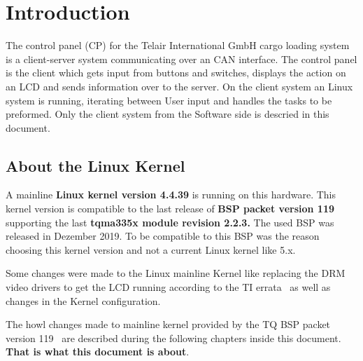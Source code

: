 \chapter{Introduction}\label{chp:einleitung}
The control panel (CP) for the Telair International GmbH cargo loading system is
a client-server system communicating over an CAN interface. The control panel is
the client which gets input from buttons and switches, displays the action on an
LCD and sends information over to the server. On the client system an Linux
system is running, iterating between User input and handles the tasks  to be
preformed.  Only the client system from the Software side is descried in this
document.

\section{About the Linux Kernel}%

A mainline \textbf{Linux kernel version 4.4.39} is running on this hardware.
This kernel version is compatible to the last release of \textbf{\gls{BSP}
packet version 119} supporting the last \textbf{tqma335x module revision 2.2.3.}
The used \gls{BSP} was released in Dezember 2019. To be compatible to this
BSP was the reason choosing this kernel version and not a current Linux kernel
like 5.x.

Some changes were made to the Linux mainline Kernel like replacing the \gls{DRM}
video drivers to get the LCD running according to the TI
errata~\cite{TI_am335x_errata} as well as changes in the Kernel configuration.

The howl changes made to mainline kernel provided by the TQ BSP packet version
119~\cite{tq_bsp119} are described during the following chapters inside this
document. \textbf{That is what this document is about}.
